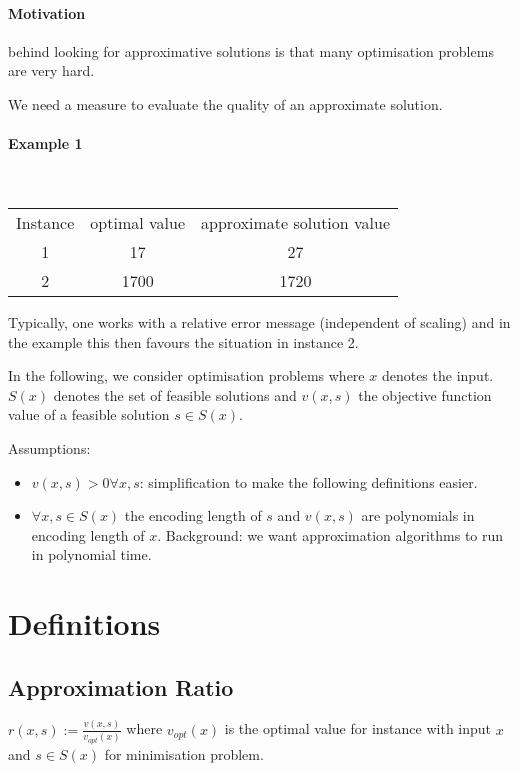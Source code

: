 \documentclass[11pt]{article}
\theoremstyle{definition}
\theoremstyle{definition}
\begin{document}
\paragraph{Motivation} behind looking for approximative solutions is that many optimisation problems are very hard.

We need a measure to evaluate the quality of an approximate solution.

\paragraph{Example 1} \ \\

\begin{tabular}{c c c}
Instance & optimal value & approximate solution value \\
1 &  17 & 27 \\
2 & 1700 & 1720 \\
\end{tabular} \medskip

Typically, one works with a relative error message (independent of scaling) and in the example this then favours the situation in instance 2.

In the following, we consider optimisation problems where $ x $ denotes the input. $ S(x) $ denotes the set of feasible solutions and $ v(x, s) $ the objective function value of a feasible solution $ s \in S(x) $.

Assumptions:
\begin{itemize}
\item $ v(x, s) > 0 \forall x, s $: simplification to make the following definitions easier.
\item $ \forall x, s \in S(x) $ the encoding length of $ s $ and $ v(x, s) $ are polynomials in encoding length of $ x $. Background: we want approximation algorithms to run in polynomial time.
\end{itemize}

\section{Definitions}

\subsection{Approximation Ratio}
$ r(x, s) := \frac{v(x, s)}{v_{opt} (x)} $ where $ v_{opt} (x) $ is the optimal value for instance with input $ x $ and $ s \in S(x) $ for minimisation problem.
\end{document}
